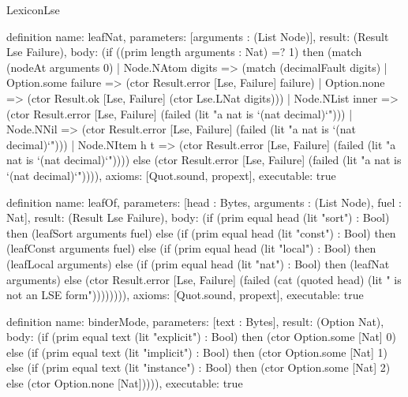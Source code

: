 \begin{lexlean}{LexiconLse}
\begin{semanticmodule}
definition{
  name: leafNat,
  parameters: [arguments : (List Node)],
  result: (Result Lse Failure),
  body: (if ((prim length arguments : Nat) =? 1) then (match (nodeAt arguments 0)
    | Node.NAtom digits => (match (decimalFault digits)
      | Option.some failure => (ctor Result.error [Lse, Failure] failure)
      | Option.none => (ctor Result.ok [Lse, Failure] (ctor Lse.LNat digits)))
    | Node.NList inner => (ctor Result.error [Lse, Failure] (failed (lit "a nat is `(nat decimal)`")))
    | Node.NNil => (ctor Result.error [Lse, Failure] (failed (lit "a nat is `(nat decimal)`")))
    | Node.NItem h t => (ctor Result.error [Lse, Failure] (failed (lit "a nat is `(nat decimal)`")))) else (ctor Result.error [Lse, Failure] (failed (lit "a nat is `(nat decimal)`")))),
  axioms: [Quot.sound, propext],
  executable: true
}

definition{
  name: leafOf,
  parameters: [head : Bytes, arguments : (List Node), fuel : Nat],
  result: (Result Lse Failure),
  body: (if (prim equal head (lit "sort") : Bool) then (leafSort arguments fuel) else (if (prim equal head (lit "const") : Bool) then (leafConst arguments fuel) else (if (prim equal head (lit "local") : Bool) then (leafLocal arguments) else (if (prim equal head (lit "nat") : Bool) then (leafNat arguments) else (ctor Result.error [Lse, Failure] (failed (cat (quoted head) (lit " is not an LSE form")))))))),
  axioms: [Quot.sound, propext],
  executable: true
}

definition{
  name: binderMode,
  parameters: [text : Bytes],
  result: (Option Nat),
  body: (if (prim equal text (lit "explicit") : Bool) then (ctor Option.some [Nat] 0) else (if (prim equal text (lit "implicit") : Bool) then (ctor Option.some [Nat] 1) else (if (prim equal text (lit "instance") : Bool) then (ctor Option.some [Nat] 2) else (ctor Option.none [Nat])))),
  executable: true
}


\end{semanticmodule}
\end{lexlean}
